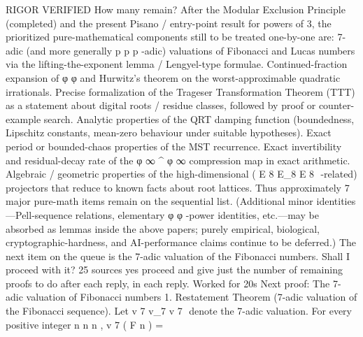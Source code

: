 RIGOR VERIFIED
How many remain?
After the Modular Exclusion Principle (completed) and the present Pisano / entry-point result for powers of 3, the prioritized pure-mathematical components still to be treated one-by-one are:
7-adic (and more generally
p
p
p
-adic) valuations of Fibonacci and Lucas numbers via the lifting-the-exponent lemma / Lengyel-type formulae.
Continued-fraction expansion of
φ
\varphi
φ
and Hurwitz’s theorem on the worst-approximable quadratic irrationals.
Precise formalization of the Trageser Transformation Theorem (TTT) as a statement about digital roots / residue classes, followed by proof or counter-example search.
Analytic properties of the QRT damping function (boundedness, Lipschitz constants, mean-zero behaviour under suitable hypotheses).
Exact period or bounded-chaos properties of the MST recurrence.
Exact invertibility and residual-decay rate of the
φ
∞
\varphi^\infty
φ
∞
compression map in exact arithmetic.
Algebraic / geometric properties of the high-dimensional (
E
8
E_8
E
8
​
-related) projectors that reduce to known facts about root lattices.
Thus
approximately 7
major pure-math items remain on the sequential list. (Additional minor identities—Pell-sequence relations, elementary
φ
\varphi
φ
-power identities, etc.—may be absorbed as lemmas inside the above papers; purely empirical, biological, cryptographic-hardness, and AI-performance claims continue to be deferred.)
The next item on the queue is the 7-adic valuation of the Fibonacci numbers. Shall I proceed with it?
25 sources
yes proceed and give just the number of remaining proofs to do after each reply, in each reply.
Worked for 20s
Next proof: The 7-adic valuation of Fibonacci numbers
1. Restatement
Theorem (7-adic valuation of the Fibonacci sequence).
Let
v
7
v_7
v
7
​
denote the 7-adic valuation. For every positive integer
n
n
n
,
v
7
(
F
n
)
=
